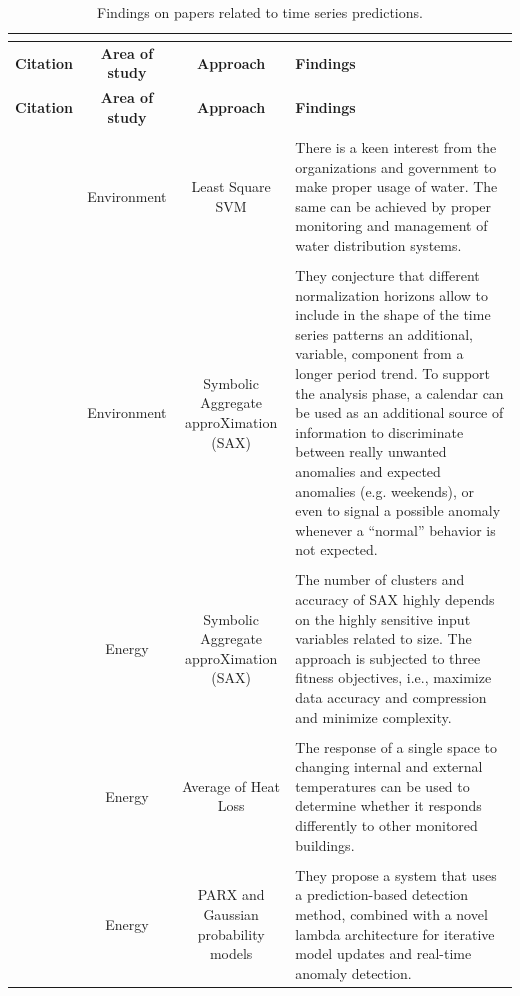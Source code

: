 \documentclass[a4paper,12pt,twoside]{ThesisStyle}
\begin{document}
\renewcommand{\arraystretch}{1.5}
\begin{landscape}
\begin{longtable}{  l  c  c  l  }
\caption{Findings on papers related to time series predictions.}  \\
\label{taula:PTSP}  \\
 \hline
  \textbf{Citation} & \textbf{Area of study} & \textbf{Approach} & \textbf{Findings}  \\
\hline 
\endfirsthead
 \hline
  \textbf{Citation} & \textbf{Area of study} & \textbf{Approach} & \textbf{Findings}  \\
\hline 
\endhead
\hline
\endfoot
\\
\parbox{1.1cm}{~\cite{vijai2016design}}  & Environment & Least Square SVM & \parbox{12.5cm}{There is a keen interest from the organizations and government to make proper usage of water. The same can be achieved by proper monitoring and management of water distribution systems.} \\
\\
\parbox{1.8cm}{~\cite{Carbone2017heating}}  & Environment & \parbox{3.5cm}{Symbolic Aggregate approXimation (SAX)} & \parbox{12.5cm}{They conjecture that different normalization horizons allow to include in the shape of the time series patterns an additional, variable, component from a longer period trend. To support the analysis phase, a calendar can be used as an additional source of information to discriminate between really unwanted anomalies and expected anomalies (e.g. weekends), or even to signal a possible anomaly whenever a “normal” behavior is not expected.} \\
\\
\parbox{1.7cm}{~\cite{fonseca2017unsupervised}}  & Energy & \parbox{3cm}{Symbolic Aggregate approXimation (SAX)} & \parbox{12.5cm}{ The number of clusters and accuracy of SAX highly depends on the highly sensitive input variables related to size. The approach is subjected to three fitness objectives, i.e., maximize data accuracy and compression and minimize complexity.} \\
\\
\parbox{1.6cm}{~\cite{gerrish2017analysis}}  & Energy & \parbox{3cm}{Average of Heat Loss} & \parbox{12.5cm}{The response of a single space to changing internal and external temperatures can be used to determine whether it responds differently to other monitored buildings.} \\
\\
\parbox{0.5cm}{~\cite{liu2018scalable}} & Energy & \parbox{3.5cm}{PARX and Gaussian probability models} & \parbox{12.5cm}{They propose a system that uses a prediction-based detection method, combined with a novel lambda architecture for iterative model updates and real-time anomaly detection.} \\

\end{longtable}
\end{landscape}
\end{document}

